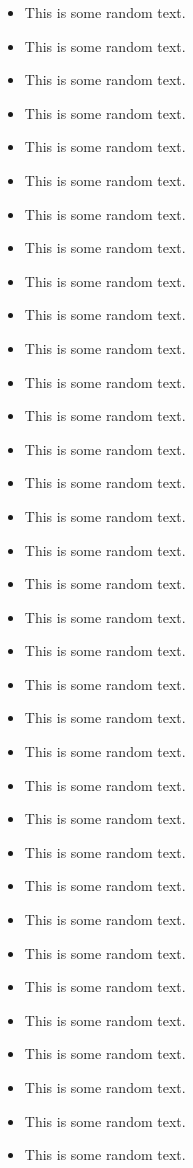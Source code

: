 \begin{itemize}
	\item This is some random text.
	\item This is some random text.
	\item This is some random text.
	\item This is some random text.
	\item This is some random text.
	\item This is some random text.
	\item This is some random text.
	\item This is some random text.
	\item This is some random text.
	\item This is some random text.
	\item This is some random text.
	\item This is some random text.
	\item This is some random text.
	\item This is some random text.
	\item This is some random text.
	\item This is some random text.
	\item This is some random text.
	\item This is some random text.
	\item This is some random text.
	\item This is some random text.
	\item This is some random text.
	\item This is some random text.
	\item This is some random text.
	\item This is some random text.
		\item This is some random text.
	\item This is some random text.
	\item This is some random text.
	\item This is some random text.
	\item This is some random text.
	\item This is some random text.
	\item This is some random text.
	\item This is some random text.
	\item This is some random text.
	\item This is some random text.
	\item This is some random text.

\end{itemize}
